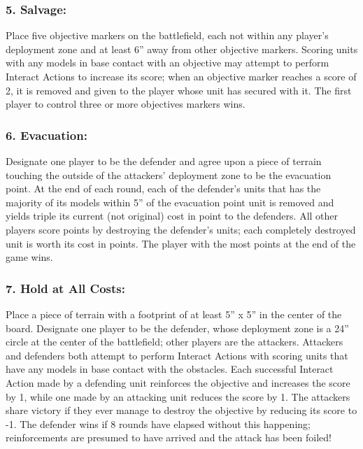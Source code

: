 \begin{multicols}{2}
\subsubsection*{5. Salvage:} Place five objective markers on the battlefield, each not within any player's deployment zone and at least 6'' away from other objective markers. Scoring units with any models in base contact with an objective may attempt to perform Interact Actions to increase its score; when an objective marker reaches a score of 2, it is removed and given to the player whose unit has secured with it. The first player to control three or more objectives markers wins.

\subsubsection*{6. Evacuation:} Designate one player to be the defender and agree upon a piece of terrain touching the outside of the attackers' deployment zone to be the evacuation point. At the end of each round, each of the defender's units that has the majority of its models within 5'' of the evacuation point unit is removed and yields triple its current (not original) cost in point to the defenders. All other players score points by destroying the defender's units; each completely destroyed unit is worth its cost in points. The player with the most points at the end of the game wins.

\subsubsection*{7. Hold at All Costs:} Place a piece of terrain with a footprint of at least 5'' x 5'' in the center of the board. Designate one player to be the defender, whose deployment zone is a 24'' circle at the center of the battlefield; other players are the attackers. Attackers and defenders both attempt to perform Interact Actions with scoring units that have any models in base contact with the obstacles. Each successful Interact Action made by a defending unit reinforces the objective and increases the score by 1, while one made by an attacking unit reduces the score by 1. The attackers share victory if they ever manage to destroy the objective by reducing its score to -1. The defender wins if 8 rounds have elapsed without this happening; reinforcements are presumed to have arrived and the attack has been foiled!


\end{multicols}
